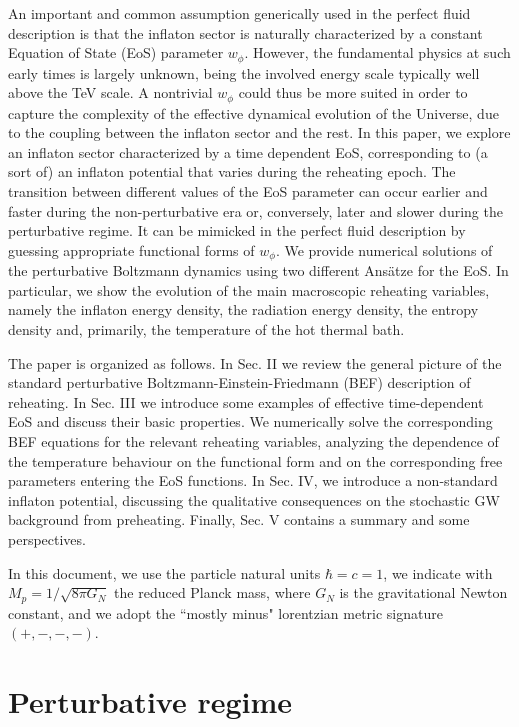 \documentclass[%
aps,prd,nofootinbib,showkeys,a4paper,10pt
]{revtex4-2}
\begin{document}
An important and common assumption generically used in the perfect fluid description is that the inflaton sector is 
naturally characterized by a constant Equation of State (EoS) parameter $w_{\phi}$.  
However, the fundamental physics at such early times is largely unknown, being the involved energy scale typically well above the TeV scale. 
A nontrivial $w_{\phi}$ could thus be more suited in order 
to capture the complexity of the effective dynamical evolution of the Universe, due to the coupling between the inflaton sector and the rest.
In this paper, we explore an inflaton sector characterized by a time dependent EoS, corresponding to (a sort of) an inflaton potential that varies during the reheating epoch.
The transition between different values of the EoS parameter
can occur earlier and faster during the non-perturbative era or, conversely, later and slower during the perturbative regime.
It can be mimicked in the perfect fluid description by guessing appropriate functional forms of $w_{\phi}$.  
We provide numerical solutions of the perturbative Boltzmann dynamics using two different Ans\"atze for the EoS. 
In particular, we show the evolution of the main macroscopic reheating variables, 
namely the inflaton energy density, the radiation energy density, the entropy density and, primarily, the temperature of the hot thermal bath.

The paper is organized as follows.  
In Sec. II we review the general picture of the standard perturbative Boltzmann-Einstein-Friedmann (BEF) description of reheating. 
In Sec. III we introduce some examples of effective time-dependent EoS and discuss their basic properties. 
We numerically solve the corresponding BEF equations for the relevant reheating variables, 
analyzing the dependence of the temperature behaviour on the functional form 
and on the corresponding free parameters entering the EoS functions.
In Sec. IV, we introduce a non-standard inflaton potential, 
discussing the qualitative consequences on the stochastic GW background from preheating.
Finally, Sec. V contains a summary and some perspectives.

In this document, we use the particle natural units $\hbar=c=1$, 
we indicate with $M_p=1/\sqrt{8\pi G_{N}}$ the reduced Planck mass,
where $G_{N}$ is the gravitational Newton constant, and we adopt the ``mostly minus" lorentzian metric signature $(+,-,-,-)$.




\section{Perturbative regime} 
\end{document}
